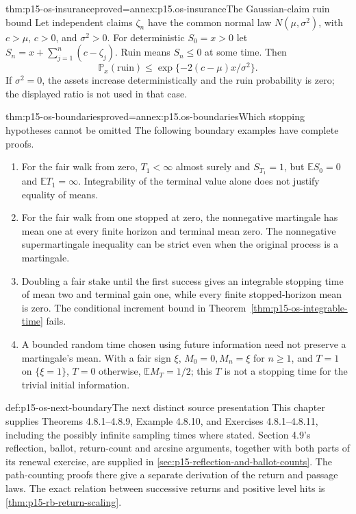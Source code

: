 \begin{hbtheorem}{thm:p15-os-insurance}{proved=annex:p15.os-insurance}{The Gaussian-claim ruin bound}
Let independent claims \(\zeta_n\) have the common normal law
\(N(\mu,\sigma^2)\), with \(c>\mu\), \(c>0\), and
\(\sigma^2>0\). For deterministic \(S_0=x>0\) let
\(S_n=x+\sum_{j=1}^n(c-\zeta_j)\).
Ruin means \(S_n\leq0\) at some time. Then
\[
 \mathbb P_x(\text{ruin})
              \leq\exp\{-2(c-\mu)x/\sigma^2\}.
 \]
If \(\sigma^2=0\), the assets increase deterministically and
the ruin probability is zero; the displayed ratio is not
used in that case.
\end{hbtheorem}

\begin{hbtheorem}{thm:p15-os-boundaries}{proved=annex:p15.os-boundaries}{Which stopping hypotheses cannot be omitted}
The following boundary examples have complete proofs.
\begin{enumerate}
\item For the fair walk from zero, \(T_1<\infty\) almost surely
 and \(S_{T_1}=1\), but \(\mathbb ES_0=0\) and
 \(\mathbb ET_1=\infty\). Integrability of the terminal value
 alone does not justify equality of means.
\item For the fair walk from one stopped at zero,
 the nonnegative martingale has mean one at every finite horizon
 and terminal mean zero. The nonnegative supermartingale inequality
 can be strict even when the original process is a martingale.
\item Doubling a fair stake until the first success gives an
 integrable stopping time of mean two and terminal gain one,
 while every finite stopped-horizon mean is zero. The conditional
 increment bound in Theorem~\ref{thm:p15-os-integrable-time}
 fails.
\item A bounded random time chosen using future information need
 not preserve a martingale's mean. With a fair sign \(\xi\),
 \(M_0=0,M_n=\xi\) for \(n\geq1\), and \(T=1\) on \(\{\xi=1\}\), \(T=0\)
 otherwise, \(\mathbb EM_T=1/2\); this \(T\) is not a stopping time
 for the trivial initial information.
\end{enumerate}
\end{hbtheorem}

\begin{proofboundary}{def:p15-os-next-boundary}{The next distinct source presentation}
This chapter supplies Theorems 4.8.1--4.8.9, Example 4.8.10,
and Exercises 4.8.1--4.8.11, including the possibly infinite
sampling times where stated.
Section 4.9's reflection, ballot, return-count and arcsine arguments,
together with both parts of its renewal exercise, are supplied in
\cref{sec:p15-reflection-and-ballot-counts}. The path-counting proofs
there give a separate derivation of the return and passage laws.
The exact relation between successive returns and positive level hits
is \cref{thm:p15-rb-return-scaling}.
\end{proofboundary}
